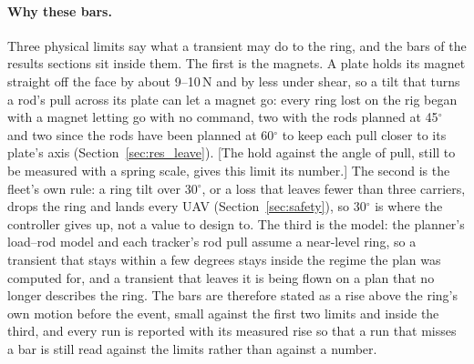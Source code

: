 \paragraph{Why these bars.} Three physical limits say what a transient may do to the ring, and the bars of the
results sections sit inside them. The first is the magnets. A plate holds its magnet straight off the face by
about 9--10\,N and by less under shear, so a tilt that turns a rod's pull across its plate can let a magnet go:
every ring lost on the rig began with a magnet letting go with no command, two with the rods planned at
45$^\circ$ and two since the rods have been planned at 60$^\circ$ to keep each pull closer to its plate's axis
(Section~\ref{sec:res_leave}). [The hold against the angle of pull, still to be measured with a spring scale,
gives this limit its number.] The second is the fleet's own rule:
a ring tilt over 30$^\circ$, or a loss that leaves fewer than three carriers, drops the ring and lands every UAV
(Section~\ref{sec:safety}), so
30$^\circ$ is where the controller gives up, not a value to design to. The third is the model: the planner's
load--rod model and each tracker's rod pull assume a near-level ring, so a transient that stays within a few
degrees stays inside the regime the plan was computed for, and a transient that leaves it is being flown on a
plan that no longer describes the ring. The bars are therefore stated as a rise above the ring's own motion
before the event, small against the first two limits and inside the third, and every run is reported with its
measured rise so that a run that misses a bar is still read against the limits rather than against a number.
